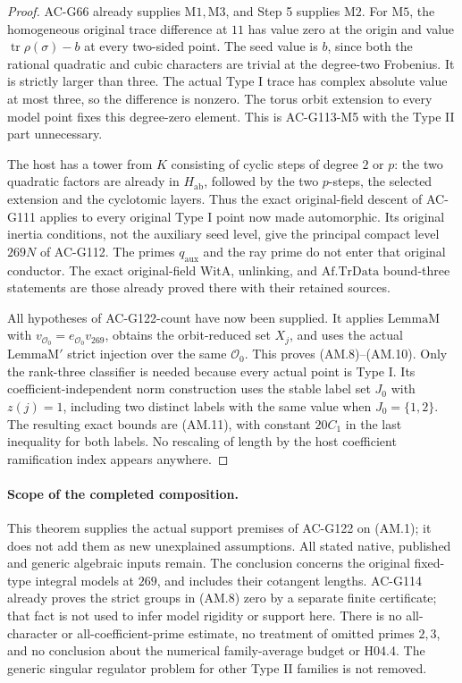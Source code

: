 \begin{proof}
AC-G66 already supplies \(\mathrm{M1},\mathrm{M3}\),
and Step 5 supplies \(\mathrm{M2}\).
For \(\mathrm{M5}\), the homogeneous original trace
difference at \(11\) has value zero at the origin and
value \(\operatorname{tr}\rho(\sigma)-b\) at every
two-sided point.  The seed value is \(b\), since both
the rational quadratic and cubic characters are trivial
at the degree-two Frobenius.  It is strictly larger than
three.  The actual Type I trace has complex absolute
value at most three, so the difference is nonzero.
The torus orbit extension to every model point fixes
this degree-zero element.  This is AC-G113-M5 with
the Type II part unnecessary.

The host has a tower from \(K\) consisting of cyclic
steps of degree \(2\) or \(p\): the two quadratic
factors are already in \(H_{\mathrm{ab}}\), followed
by the two \(p\)-steps, the selected extension and
the cyclotomic layers.
Thus the exact original-field descent of AC-G111
applies to every original Type I point now made
automorphic.  Its original inertia conditions, not the
auxiliary seed level, give the principal compact level
\(269N\) of AC-G112.  The primes \(q_{\mathrm{aux}}\)
and the ray prime do not enter that original conductor.
The exact original-field \(\mathrm{WitA}\), unlinking,
and \(\mathrm{Af.TrData}\) bound-three statements are
those already proved there with their retained sources.

All hypotheses of AC-G122-count have now been supplied.
It applies \(\mathrm{LemmaM}\) with
\(v_{\mathcal O_0}=e_{\mathcal O_0}v_{269}\), obtains
the orbit-reduced set \(X_j\), and uses the actual
\(\mathrm{LemmaM'}\) strict injection over the same
\(\mathcal O_0\).  This proves (AM.8)--(AM.10).
Only the rank-three classifier is needed because every
actual point is Type I.  Its coefficient-independent
norm construction uses the stable label set \(J_0\)
with \(z(j)=1\), including two distinct labels with
the same value when \(J_0=\{1,2\}\).
The resulting exact bounds are (AM.11), with
constant \(20C_1\) in the last inequality for both labels.
No rescaling of length by the host coefficient ramification
index appears anywhere.
\end{proof}

\paragraph{Scope of the completed composition.}
This theorem supplies the actual support premises of AC-G122
on (AM.1); it does not add them as new unexplained assumptions.
All stated native, published and generic algebraic inputs remain.
The conclusion concerns the original fixed-type integral models
at \(269\), and includes their cotangent lengths.
AC-G114 already proves the strict groups in (AM.8) zero by
a separate finite certificate; that fact is not used to infer
model rigidity or support here.
There is no all-character or all-coefficient-prime estimate,
no treatment of omitted primes \(2,3\), and no conclusion
about the numerical family-average budget or H04.4.
The generic singular regulator problem for other Type II
families is not removed.

